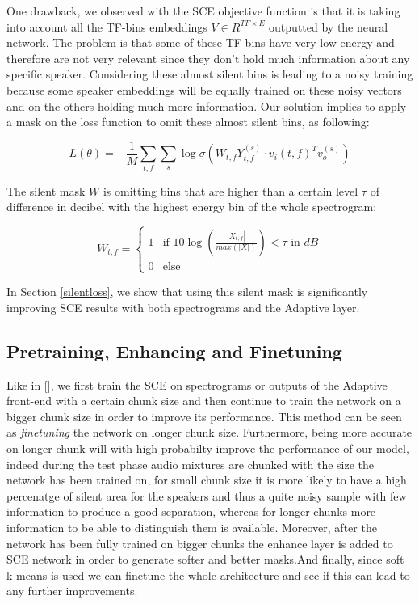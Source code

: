 \documentclass[master, tikz, final,11pt, dvipdfmx]{iscs-thesis}
\begin{document}
One drawback, we observed with the SCE objective function is that it is taking into account all the TF-bins embeddings $V \in R^{TF\times E}$ outputted by the neural network. The problem is that some of these TF-bins have very low energy and therefore are not very relevant since they don't hold much information about any specific speaker. Considering these almost silent bins is leading to a noisy training because some speaker embeddings will be equally trained on these noisy vectors and on the others holding much more information. Our solution implies to apply a mask on the loss function to omit these almost silent bins, as following:

\[L(\theta) = - \frac{1}{M} \sum_{t,f} \sum_{s} \log \sigma(W_{t,f}Y_{t,f}^{(s)}  \cdot v_i(t,f)^{T} v_o^{(s)})\]

The silent mask $W$ is omitting bins that are higher than a certain level $\tau$ of difference in decibel with the highest energy bin of the whole spectrogram:

$$
W_{t,f} =  \left\{
    \begin{array}{ll}
        1 & \mbox{if } 10\log (\frac{|X_{t,f}|}{max(|X|)}) < \tau \mbox{ in } dB  \\
        0 & \mbox{else}
    \end{array}
\right.
$$

In Section \ref{silentloss}, we show that using this silent mask is significantly improving SCE results with both spectrograms and the Adaptive layer.

\subsection{Pretraining, Enhancing and Finetuning}

Like in [], we first train the SCE on spectrograms or outputs of the Adaptive front-end with a certain chunk size and then continue to train the network on a bigger chunk size in order to improve its performance. This method can be seen as \textit{finetuning} the network on longer chunk size. Furthermore, being more accurate on longer chunk will with high probabilty improve the performance of our model, indeed during the test phase audio mixtures are chunked with the size the network has been trained on, for small chunk size it is more likely to have a high percenatge of silent area for the speakers and thus a quite noisy sample with few information to produce a good separation, whereas for longer chunks more information to be able to distinguish them is available.
Moreover, after the network has been fully trained on bigger chunks the enhance layer is added to SCE network in order to generate softer and better masks.And finally, since soft k-means is used we can finetune the whole architecture and see if this can lead to any further improvements.
\end{document}
